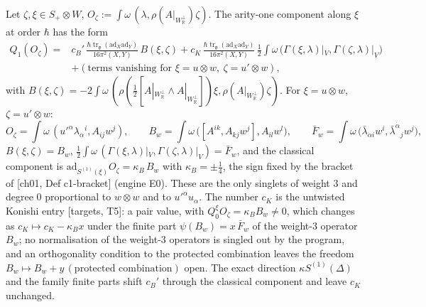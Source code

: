 \begin{proposition}
\label{prop:o-konishi}
Let $\zeta,\xi\in S_+\otimes W$, $O_\zeta:=\int\omega\,(\lambda,\rho(A|_{W_{\mathbb R}^\perp})\zeta)$. The arity-one component along $\xi$ at order $\hbar$ has the form
\begin{equation}
\begin{aligned}
Q_1(O_\zeta)={}&c_B'\,\frac{\hbar\operatorname{tr}_{\mathfrak g}(\mathrm{ad}_X\mathrm{ad}_Y)}{16\pi^2(X,Y)}\,B(\xi,\zeta)+c_K\,\frac{\hbar\operatorname{tr}_{\mathfrak g}(\mathrm{ad}_X\mathrm{ad}_Y)}{16\pi^2(X,Y)}\,\tfrac12\int\omega\,\big(\Gamma(\xi,\lambda)|_V,\Gamma(\zeta,\lambda)|_V\big)\\
&+(\text{terms vanishing for }\xi=u\otimes w,\ \zeta=u'\otimes w),
\end{aligned}
\label{eq:o-konishi}
\end{equation}
with $B(\xi,\zeta)=-2\int\omega\,(\rho(\tfrac12[A|_{W_{\mathbb R}^\perp}\wedge A|_{W_{\mathbb R}^\perp}])\xi,\rho(A|_{W_{\mathbb R}^\perp})\zeta)$. For $\xi=u\otimes w$, $\zeta=u'\otimes w$:
\begin{equation}
O_\zeta=\int\omega\,(u'^\alpha\lambda_\alpha{}^i,A_{ij}w^j),\qquad B_w=\int\omega\,\big([A^{ik},A_{kj}w^j],A_{il}w^l\big),\qquad \bar F_w=\int\omega\,\big(\bar\lambda_{\dot\alpha i}w^i,\bar\lambda^{\dot\alpha}{}_jw^j\big),
\label{eq:o-BF}
\end{equation}
$B(\xi,\zeta)=B_w$, $\tfrac12\int\omega\,(\Gamma(\xi,\lambda)|_V,\Gamma(\zeta,\lambda)|_V)=\bar F_w$, and the classical component is $\mathrm{ad}_{S^{(1)}(\xi)}O_\zeta=\kappa_B\,B_w$ with $\kappa_B=\pm\tfrac14$, the sign fixed by the bracket of [ch01, Def c1-bracket] (engine E0). These are the only singlets of weight $3$ and degree $0$ proportional to $w\otimes w$ and to $u'^\alpha u_\alpha$. The number $c_K$ is the untwisted Konishi entry [targets, T5]: a pair value, with $Q^\xi_0O_\zeta=\kappa_BB_w\neq0$, which changes as $c_K\mapsto c_K-\kappa_Bx$ under the finite part $\psi(B_w)=x\,\bar F_w$ of the weight-$3$ operator $B_w$; no normalisation of the weight-$3$ operators is singled out by the program, and an orthogonality condition to the protected combination leaves the freedom $B_w\mapsto B_w+y\,(\text{protected combination})$ open. The exact direction $\kappa S^{(1)}(\Delta)$ and the family finite parts shift $c_B'$ through the classical component and leave $c_K$ unchanged.
\end{proposition}

